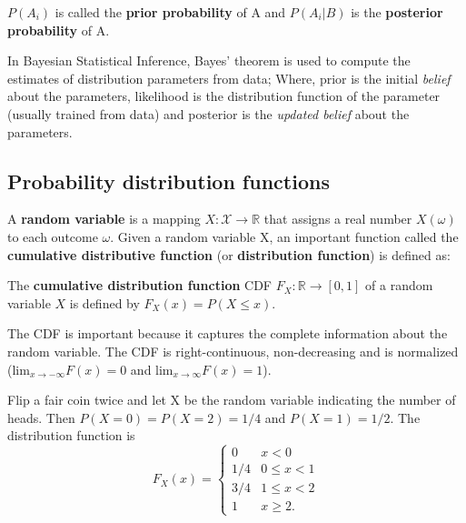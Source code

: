 \begin{remark}
$P(A_{i})$ is called the {\bf prior probability} of A and $P(A_{i}|B)$ is the {\bf posterior probability} of A.
\end{remark}

\begin{remark}
In Bayesian Statistical Inference, Bayes' theorem is used to compute the estimates of distribution parameters 
from data; Where, prior is the initial {\em belief} about the parameters, likelihood is the distribution function  
of the parameter (usually trained from data) and posterior is the {\em updated belief} about the parameters.
\end{remark}

\subsection{Probability distribution functions}

A {\bf random variable} is a mapping $X:\mathcal{X} \rightarrow \mathbb{R}$ that assigns a real number $X(\omega)$
to each outcome $\omega$. Given a random variable X, an important function called the {\bf cumulative distributive
function} (or {\bf distribution function}) is defined as:

\begin{definition}
The {\bf cumulative distribution function} CDF $F_{X}: \mathbb{R} \rightarrow [0,1]$ of a random variable $X$ is defined by
$F_X(x) = P(X \leq x)$.
\end{definition}

The CDF is important because it captures the complete information about the random variable. The CDF is right-continuous,
non-decreasing and is normalized (lim$_{x\rightarrow -\infty} F(x) = 0$ and lim$_{x\rightarrow \infty} F(x)=1$).


\begin{example} 
  Flip a fair coin twice and let X be the random variable indicating the number of heads. Then 
$P(X=0)=P(X=2)= 1/4$ and $P(X=1)=1/2$. The distribution function is 
\begin{equation*}
F_{X}(x)=\left\{\begin{array}{cc}
0 & x<0\\
1/4 & 0 \leq x < 1 \\
3/4 & 1 \leq x < 2 \\
1 & x \geq 2.
\end{array}\right.
\end{equation*}
\end{example}

